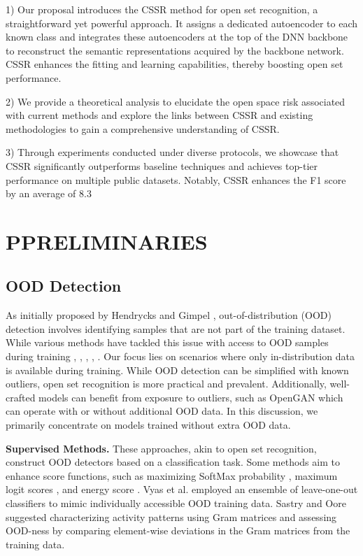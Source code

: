 \documentclass{gji}
\begin{document}
1) Our proposal introduces the CSSR method for open set recognition, a straightforward yet powerful approach. It assigns a dedicated autoencoder to each known class and integrates these autoencoders at the top of the DNN backbone to reconstruct the semantic representations acquired by the backbone network. CSSR enhances the fitting and learning capabilities, thereby boosting open set performance.

2) We provide a theoretical analysis to elucidate the open space risk associated with current methods and explore the links between CSSR and existing methodologies to gain a comprehensive understanding of CSSR.

3) Through experiments conducted under diverse protocols, we showcase that CSSR significantly outperforms baseline techniques and achieves top-tier performance on multiple public datasets. Notably, CSSR enhances the F1 score by an average of 8.3%


\section{\textbf \textsc{PPRELIMINARIES}}

\subsection{OOD Detection}

As initially proposed by Hendrycks and Gimpel \cite {15}, out-of-distribution (OOD) detection involves identifying samples that are not part of the training dataset. While various methods have tackled this issue with access to OOD samples during training  \cite {10}, \cite {21}, \cite {23},  \cite {31}, \cite {49}. Our focus lies on scenarios where only in-distribution data is available during training. While OOD detection can be simplified with known outliers, open set recognition is more practical and prevalent. Additionally, well-crafted models can benefit from exposure to outliers, such as OpenGAN \cite {19} which can operate with or without additional OOD data. In this discussion, we primarily concentrate on models trained without extra OOD data.

\textbf{Supervised Methods.} These approaches, akin to open set recognition, construct OOD detectors based on a classification task. Some methods aim to enhance score functions, such as maximizing SoftMax probability \cite {15}, maximum logit scores \cite {14}, and energy score \cite {23}. Vyas et al. \cite {40} employed an ensemble of leave-one-out classifiers to mimic individually accessible OOD training data. Sastry and Oore \cite{33} suggested characterizing activity patterns using Gram matrices and assessing OOD-ness by comparing element-wise deviations in the Gram matrices from the training data.
\end{document}
